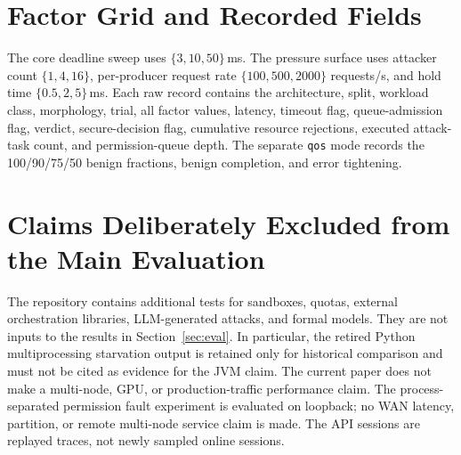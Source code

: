 \section{Factor Grid and Recorded Fields}

The core deadline sweep uses $\{3,10,50\}$\,ms. The pressure surface uses
attacker count $\{1,4,16\}$, per-producer request rate
$\{100,500,2000\}$ requests/s, and hold time $\{0.5,2,5\}$\,ms. Each raw
record contains the architecture, split, workload class, morphology, trial,
all factor values, latency, timeout flag, queue-admission flag, verdict,
secure-decision flag, cumulative resource rejections, executed attack-task
count, and permission-queue depth. The separate \texttt{qos} mode records
the 100/90/75/50 benign fractions, benign completion, and error tightening.

\section{Claims Deliberately Excluded from the Main Evaluation}

The repository contains additional tests for sandboxes, quotas, external
orchestration libraries, LLM-generated attacks, and formal models. They are
not inputs to the results in Section~\ref{sec:eval}. In particular, the
retired Python multiprocessing starvation output is retained only for
historical comparison and must not be cited as evidence for the JVM claim.
The current paper does not make a multi-node, GPU, or production-traffic
performance claim. The process-separated permission fault experiment is
evaluated on loopback; no WAN latency, partition, or remote multi-node service
claim is made. The API sessions are replayed traces, not newly sampled online
sessions.

